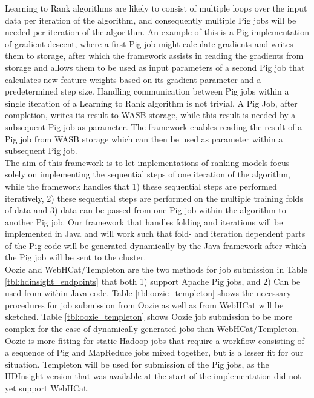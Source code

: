 Learning to Rank algorithms are likely to consist of multiple loops over the input data per iteration of the algorithm, and consequently multiple Pig jobs will be needed per iteration of the algorithm. An example of this is a Pig implementation of gradient descent, where a first Pig job might calculate gradients and writes them to storage, after which the framework assists in reading the gradients from storage and allows them to be used as input parameters of a second Pig job that calculates new feature weights based on its gradient parameter and a predetermined step size. Handling communication between Pig jobs within a single iteration of a Learning to Rank algorithm is not trivial. A Pig Job, after completion, writes its result to \ac{WASB} storage, while this result is needed by a subsequent Pig job as parameter. The framework enables reading the result of a Pig job from \ac{WASB} storage which can then be used as parameter within a subsequent Pig job. \\

The aim of this framework is to let implementations of ranking models focus solely on implementing the sequential steps of one iteration of the algorithm, while the framework handles that 1) these sequential steps are performed iteratively, 2) these sequential steps are performed on the multiple training folds of data and 3) data can be passed from one Pig job within the algorithm to another Pig job. Our framework that handles folding and iterations will be implemented in Java and will work such that fold- and iteration dependent parts of the Pig code will be generated dynamically by the Java framework after which the Pig job will be sent to the cluster.\\

Oozie and WebHCat/Templeton are the two methods for job submission in Table \ref{tbl:hdinsight_endpoints} that both 1) support Apache Pig jobs, and 2) Can be used from within Java code. Table \ref{tbl:oozie_templeton} shows the necessary procedures for job submission from Oozie as well as from WebHCat will be sketched. Table \ref{tbl:oozie_templeton} shows Oozie job submission to be more complex for the case of dynamically generated jobs than WebHCat/Templeton. Oozie is more fitting for static Hadoop jobs that require a workflow consisting of a sequence of Pig and MapReduce jobs mixed together, but is a lesser fit for our situation. Templeton will be used for submission of the Pig jobs, as the HDInsight version that was available at the start of the implementation did not yet support WebHCat.\\

